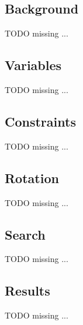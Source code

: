 
\subsection{Background}
    \colorbox{BurntOrange}{TODO missing ...}


\subsection{Variables}
    \colorbox{BurntOrange}{TODO missing ...}


\subsection{Constraints}
    \colorbox{BurntOrange}{TODO missing ...}


\subsection{Rotation}
    \colorbox{BurntOrange}{TODO missing ...}


\subsection{Search}
    \colorbox{BurntOrange}{TODO missing ...}


\subsection{Results}
    \colorbox{BurntOrange}{TODO missing ...}
